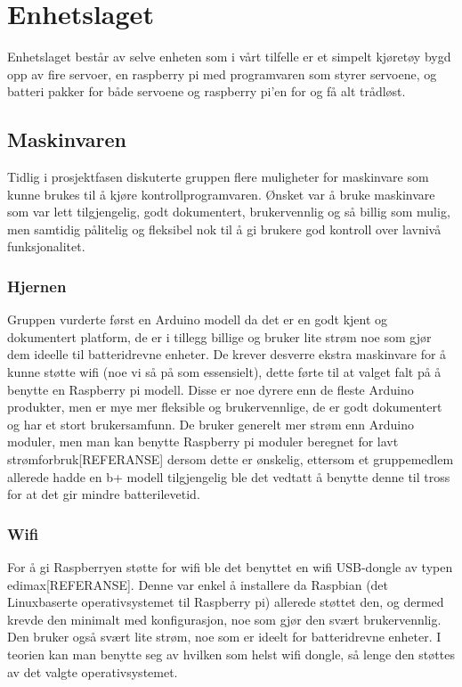 \documentclass[12pt]{report}
\begin{document}
\chapter{Enhetslaget}
Enhetslaget består av selve enheten som i vårt tilfelle er et simpelt kjøretøy bygd opp av fire servoer, en raspberry pi med programvaren som styrer servoene, og batteri pakker for både servoene og raspberry pi’en for og få alt trådløst.

\section{Maskinvaren}
Tidlig i prosjektfasen diskuterte gruppen flere muligheter for maskinvare som kunne brukes til å kjøre kontrollprogramvaren. Ønsket var å bruke maskinvare som var lett tilgjengelig, godt dokumentert, brukervennlig og så billig som mulig, men samtidig pålitelig og fleksibel nok til å gi brukere god kontroll over lavnivå funksjonalitet. 

\subsection{Hjernen}
Gruppen vurderte først en Arduino modell da det er en godt kjent og dokumentert platform, de er i tillegg billige og bruker lite strøm noe som gjør dem ideelle til batteridrevne enheter. De krever desverre ekstra maskinvare for å kunne støtte wifi (noe vi så på som essensielt), dette førte til at valget falt på å benytte en Raspberry pi modell. Disse er noe dyrere enn de fleste Arduino produkter, men er mye mer fleksible og brukervennlige, de er godt dokumentert og har et stort brukersamfunn. De bruker generelt mer strøm enn Arduino moduler, men man kan benytte Raspberry pi moduler beregnet for lavt strømforbruk[REFERANSE] dersom dette er ønskelig, ettersom et gruppemedlem allerede hadde en b+ modell tilgjengelig ble det vedtatt å benytte denne til tross for at det gir mindre batterilevetid.

\subsection{Wifi}
For å gi Raspberryen støtte for wifi ble det benyttet en wifi USB-dongle av typen edimax[REFERANSE]. Denne var enkel å installere da Raspbian (det Linuxbaserte operativsystemet til Raspberry pi) allerede støttet den, og dermed krevde den minimalt med konfigurasjon, noe som gjør den svært brukervennlig. Den bruker også svært lite strøm, noe som er ideelt for batteridrevne enheter. I teorien kan man benytte seg av hvilken som helst wifi dongle, så lenge den støttes av det valgte operativsystemet.
\end{document}
